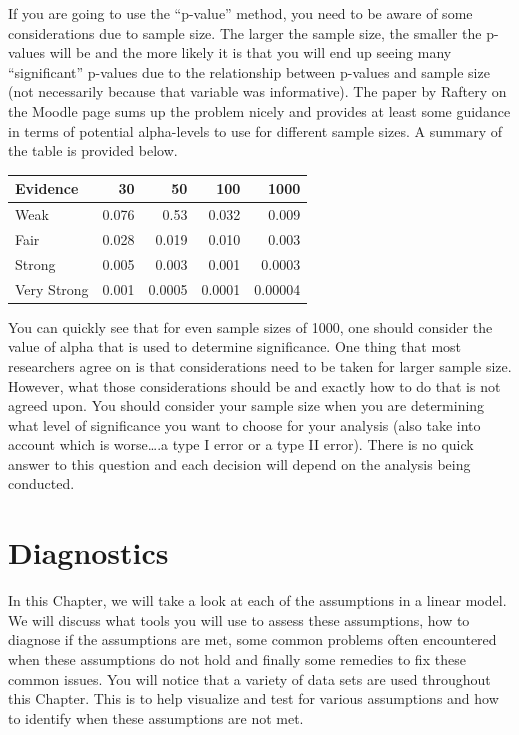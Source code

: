 \documentclass[
  letterpaper,
  DIV=11,
  numbers=noendperiod]{scrreprt}
\begin{document}
If you are going to use the ``p-value'' method, you need to be aware of
some considerations due to sample size. The larger the sample size, the
smaller the p-values will be and the more likely it is that you will end
up seeing many ``significant'' p-values due to the relationship between
p-values and sample size (not necessarily because that variable was
informative). The paper by Raftery on the Moodle page sums up the
problem nicely and provides at least some guidance in terms of potential
alpha-levels to use for different sample sizes. A summary of the table
is provided below.

\begin{longtable}[]{@{}lrrrr@{}}
\toprule()
Evidence & 30 & 50 & 100 & 1000 \\
\midrule()
\endhead
Weak & 0.076 & 0.53 & 0.032 & 0.009 \\
Fair & 0.028 & 0.019 & 0.010 & 0.003 \\
Strong & 0.005 & 0.003 & 0.001 & 0.0003 \\
Very Strong & 0.001 & 0.0005 & 0.0001 & 0.00004 \\
\bottomrule()
\end{longtable}

You can quickly see that for even sample sizes of 1000, one should
consider the value of alpha that is used to determine significance. One
thing that most researchers agree on is that considerations need to be
taken for larger sample size. However, what those considerations should
be and exactly how to do that is not agreed upon. You should consider
your sample size when you are determining what level of significance you
want to choose for your analysis (also take into account which is
worse\ldots.a type I error or a type II error). There is no quick answer
to this question and each decision will depend on the analysis being
conducted.


\hypertarget{sec-diag}{%
\chapter{Diagnostics}\label{sec-diag}}

In this Chapter, we will take a look at each of the assumptions in a
linear model. We will discuss what tools you will use to assess these
assumptions, how to diagnose if the assumptions are met, some common
problems often encountered when these assumptions do not hold and
finally some remedies to fix these common issues. You will notice that a
variety of data sets are used throughout this Chapter. This is to help
visualize and test for various assumptions and how to identify when
these assumptions are not met.
\end{document}
